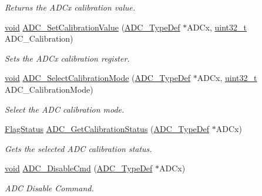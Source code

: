 \begin{DoxyCompactItemize}
\begin{DoxyCompactList}\small\item\em Returns the A\-D\-Cx calibration value. \end{DoxyCompactList}\item 
\hyperlink{group___n_a_m_e_ga18028b8badbf1ea7e704ccac3c488e82}{void} \hyperlink{group___a_d_c___exported___constants_gaf6c83aa3815a6db50f2798cb4c5da725}{A\-D\-C\-\_\-\-Set\-Calibration\-Value} (\hyperlink{struct_a_d_c___type_def}{A\-D\-C\-\_\-\-Type\-Def} $\ast$A\-D\-Cx, \hyperlink{stdint_8h_a435d1572bf3f880d55459d9805097f62}{uint32\-\_\-t} A\-D\-C\-\_\-\-Calibration)
\begin{DoxyCompactList}\small\item\em Sets the A\-D\-Cx calibration register. \end{DoxyCompactList}\item 
\hyperlink{group___n_a_m_e_ga18028b8badbf1ea7e704ccac3c488e82}{void} \hyperlink{group___a_d_c___exported___constants_gadeaec15406bee7a55a4151f5af33c0e9}{A\-D\-C\-\_\-\-Select\-Calibration\-Mode} (\hyperlink{struct_a_d_c___type_def}{A\-D\-C\-\_\-\-Type\-Def} $\ast$A\-D\-Cx, \hyperlink{stdint_8h_a435d1572bf3f880d55459d9805097f62}{uint32\-\_\-t} A\-D\-C\-\_\-\-Calibration\-Mode)
\begin{DoxyCompactList}\small\item\em Select the A\-D\-C calibration mode. \end{DoxyCompactList}\item 
\hyperlink{group___exported__types_ga89136caac2e14c55151f527ac02daaff}{Flag\-Status} \hyperlink{group___a_d_c___exported___constants_ga7a728f699b487c7fa1694d7424967122}{A\-D\-C\-\_\-\-Get\-Calibration\-Status} (\hyperlink{struct_a_d_c___type_def}{A\-D\-C\-\_\-\-Type\-Def} $\ast$A\-D\-Cx)
\begin{DoxyCompactList}\small\item\em Gets the selected A\-D\-C calibration status. \end{DoxyCompactList}\item 
\hyperlink{group___n_a_m_e_ga18028b8badbf1ea7e704ccac3c488e82}{void} \hyperlink{group___a_d_c___exported___constants_ga9f74083ca95c0060fa9903d16ccbe057}{A\-D\-C\-\_\-\-Disable\-Cmd} (\hyperlink{struct_a_d_c___type_def}{A\-D\-C\-\_\-\-Type\-Def} $\ast$A\-D\-Cx)
\begin{DoxyCompactList}\small\item\em A\-D\-C Disable Command. \end{DoxyCompactList}\item 

\end{DoxyCompactItemize}
